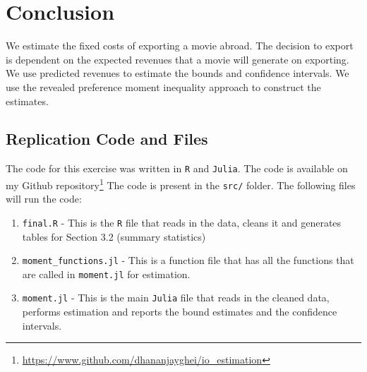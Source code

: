 \documentclass[11pt, letterpaper]{article} \usepackage{amsmath}
\begin{document}
\section{Conclusion}
We estimate the fixed costs of exporting a movie abroad. The decision
to export is dependent on the expected revenues that a movie will
generate on exporting. We use predicted revenues to estimate the
bounds and confidence intervals.  We use the revealed preference
moment inequality approach to construct the estimates.
\newpage

\newpage
\begin{appendix}
  \section{Replication Code and Files}
  The code for this exercise was written in \texttt{R} and
  \texttt{Julia}. The code is available on my Github
  repository\footnote{\url{https://www.github.com/dhananjayghei/io_estimation}}
The code is present in the \texttt{src/} folder. The following files
will run the code:
\begin{enumerate}
\item \texttt{final.R} - This is the \texttt{R} file that reads in the
  data, cleans it and generates tables for Section 3.2 (summary
  statistics)
\item \texttt{moment\_functions.jl} - This is a function file that has
  all the functions that are called in \texttt{moment.jl} for
  estimation.
\item \texttt{moment.jl} - This is the main \texttt{Julia} file that
  reads in the cleaned data, performs estimation and reports the bound
  estimates and the confidence intervals.
\end{enumerate}
\end{appendix}
\end{document}
